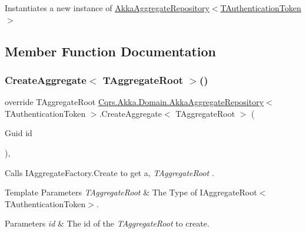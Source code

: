 Instantiates a new instance of \hyperlink{classCqrs_1_1Akka_1_1Domain_1_1AkkaAggregateRepository_afc997ba5187ca08d3f81a0c204eda3a2_afc997ba5187ca08d3f81a0c204eda3a2}{Akka\+Aggregate\+Repository$<$\+T\+Authentication\+Token$>$} 



\subsection{Member Function Documentation}
\mbox{\label{classCqrs_1_1Akka_1_1Domain_1_1AkkaAggregateRepository_a889a80595755372614382c36092f30dc_a889a80595755372614382c36092f30dc}} 
\subsubsection{\texorpdfstring{Create\+Aggregate$<$ T\+Aggregate\+Root $>$()}{CreateAggregate< TAggregateRoot >()}}
{\footnotesize\ttfamily override T\+Aggregate\+Root \hyperlink{classCqrs_1_1Akka_1_1Domain_1_1AkkaAggregateRepository}{Cqrs.\+Akka.\+Domain.\+Akka\+Aggregate\+Repository}$<$ T\+Authentication\+Token $>$.Create\+Aggregate$<$ T\+Aggregate\+Root $>$ (\begin{DoxyParamCaption}\item[{Guid}]{id }\end{DoxyParamCaption})\hspace{0.3cm}{\ttfamily [protected]}, {\ttfamily [virtual]}}



Calls I\+Aggregate\+Factory.\+Create to get a, {\itshape T\+Aggregate\+Root} . 


\begin{DoxyTemplParams}{Template Parameters}
{\em T\+Aggregate\+Root} & The Type of I\+Aggregate\+Root$<$\+T\+Authentication\+Token$>$.\\
\hline
\end{DoxyTemplParams}

\begin{DoxyParams}{Parameters}
{\em id} & The id of the {\itshape T\+Aggregate\+Root}  to create.\\
\hline
\end{DoxyParams}


